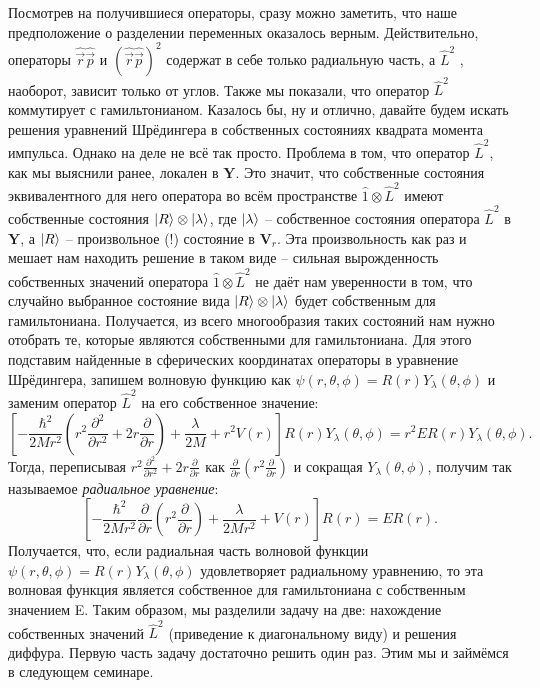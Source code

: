 Посмотрев на получившиеся операторы, сразу можно заметить, что наше предположение о разделении переменных оказалось верным. Действительно, операторы $\hat{\Vec{r}}\hat{\Vec{p}}$ и $(\hat{\Vec{r}}\hat{\Vec{p}})^2$ содержат в себе только радиальную часть, а $\hat{L}^2$ , наоборот, зависит только от углов. Также мы показали, что оператор $\hat{L}^2$ коммутирует с гамильтонианом. Казалось бы, ну и отлично, давайте будем искать решения уравнений Шрёдингера в собственных состояниях квадрата момента импульса. Однако на деле не всё так просто. Проблема в том, что оператор $\hat{L}^2$, как мы выяснили ранее, локален в $\mathbf{Y}$. Это значит, что собственные состояния эквивалентного для него оператора во всём пространстве $\hat{1}\otimes\hat{L}^2$ имеют собственные состояния $\ket{R}\otimes\ket{\lambda}$, где $\ket{\lambda}$ -- собственное состояния оператора $\hat{L}^2$ в $\mathbf{Y}$, а $\ket{R}$ -- произвольное (!) состояние в $\mathbf{V}_r$. Эта произвольность как раз и мешает нам находить решение в таком виде -- сильная вырожденность собственных значений оператора $\hat{1}\otimes\hat{L}^2$ не даёт нам уверенности в том, что случайно выбранное состояние вида $\ket{R}\otimes\ket{\lambda}$ будет собственным для гамильтониана. Получается, из всего многообразия таких состояний нам нужно отобрать те, которые являются собственными для гамильтониана. Для этого подставим найденные в сферических координатах операторы в уравнение Шрёдингера, запишем волновую функцию как $\psi(r, \theta, \phi) = R(r)Y_{\lambda}(\theta, \phi)$ и заменим оператор $\hat{L}^2$ на его собственное значение: 
\[
\left[-\frac{\hbar^2}{2Mr^2}\left( r^2\frac{\partial^2}{\partial r^2} + 2r\frac{\partial}{\partial r} \right)  + \frac{\lambda}{2M} + r^2V(r)\right]R(r)Y_{\lambda}(\theta, \phi) = r^2ER(r)Y_{\lambda}(\theta, \phi).
\]
Тогда, переписывая $r^2\frac{\partial^2}{\partial r^2} + 2r\frac{\partial}{\partial r}$ как $\frac{\partial}{\partial r}\left( r^2 \frac{\partial}{\partial r}\right)$ и сокращая $Y_{\lambda}(\theta, \phi)$, получим так называемое \textit{радиальное уравнение}:
\[
\left[-\frac{\hbar^2}{2Mr^2}\frac{\partial}{\partial r}\left( r^2 \frac{\partial}{\partial r}\right)  + \frac{\lambda}{2Mr^2} + V(r)\right]R(r) = ER(r).
\]
Получается, что, если радиальная часть волновой функции $\psi(r, \theta, \phi) = R(r)Y_{\lambda}(\theta, \phi)$ удовлетворяет радиальному уравнению, то эта волновая функция является собственное для гамильтониана с собственным значением E. Таким образом, мы разделили задачу на две: нахождение собственных значений $\hat{L}^2$ (приведение к диагональному виду) и решения диффура. Первую часть задачу достаточно решить один раз. Этим мы и займёмся в следующем семинаре.